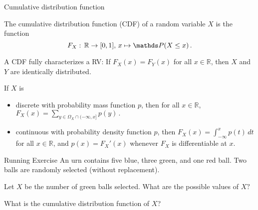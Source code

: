 \begin{vbframe}{Cumulative distribution function}
 
 The cumulative distribution function (CDF) of a random variable $X$ is the function
		$$
		F_X:\, \mathbb{R} \to [0,1], \, x \mapsto \P(X \leq x) \, .
		$$
		
A CDF fully characterizes a RV: If $F_X(x) = F_Y(x)$ for all $x \in \mathbb{R}$, then $X$ and $Y$ are identically distributed.
		
		\lz
		

If $X$ is 
\begin{itemize}
%	
	\item discrete with probability mass function $p$, then for all $x \in \mathbb{R}$, 
	$
	F_X(x) = \sum_{y \in \Omega_X \cap (-\infty, x]} p(y) \, .
	$
%	
	\item continuous with probability density function $p$, then 
	$
	F_X(x)  = \int_{-\infty}^x p(t) \, dt 
	$
	for all $x \in \mathbb{R}$, and $p(x) = F_X'(x)$ whenever $F_X$ is differentiable at $x$. 
%	
\end{itemize}

\end{vbframe}


\begin{vbframe}{Running Exercise}  
	An urn contains five blue, three green, and one red ball. Two balls are randomly selected (without replacement).
	
	\lz
	
	
	
	Let $X$ be the number of green balls selected. What are the possible values of $X?$
	
	
	\lz
	
	\lz
	\lz
	\lz
	
	What is the cumulative distribution function of $X$?
	
	
	
\end{vbframe}

